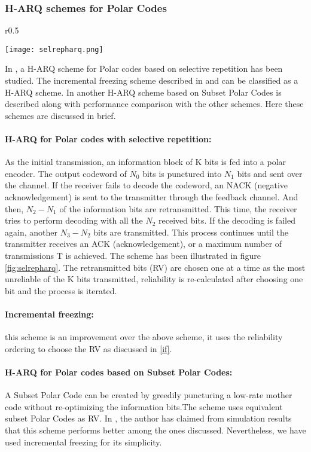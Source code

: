 \documentclass[
11pt, %
a4paper, %
oneside, %
headinclude,footinclude, %
BCOR5mm, %
]{scrartcl}
\begin{document}
\subsubsection*{H-ARQ schemes for Polar Codes}
\begin{wrapfigure}{r}{0.5\textwidth}
  \begin{center}
    \texttt{[image: selrepharq.png]}
  \end{center}
  \caption{H-ARQ for Polar Codes with selective repetition}
  \label{fig:selrepharq}
\end{wrapfigure}
In \cite{harqchen}, a H-ARQ scheme for Polar codes based on selective repetition has been studied. The incremental freezing scheme described in \cite{chen} and \cite{mondelli} can be classified as a H-ARQ scheme. In \cite{harqtav} another H-ARQ scheme based on Subset Polar Codes is described along with performance comparison with the other schemes. Here these schemes are discussed in brief.            
\paragraph{H-ARQ for Polar codes with selective repetition:}
As the initial transmission, an information block of K bits is fed into a polar
encoder. The output codeword of $N_0$ bits is punctured into $N_1$
bits and sent over the channel. If the receiver fails to decode
the codeword, an NACK (negative acknowledgement) is sent
to the transmitter through the feedback channel. And then,
$N_2-N_1$ of the information bits are retransmitted. This time,
the receiver tries to perform decoding with all the $N_2$ received
bits. If the decoding is failed again, another $N_3-N_2$ bits
are transmitted. This process continues until the transmitter
receives an ACK (acknowledgement), or a maximum number
of transmissions T is achieved. The scheme has been illustrated in figure  \ref{fig:selrepharq}. The retransmitted bits (RV) are chosen one at a time as the most unreliable of the K bits transmitted, reliability is re-calculated after choosing one bit and the process is iterated.
\paragraph{Incremental freezing:} this scheme is an improvement over the above scheme, it uses the reliability ordering to choose the RV as discussed in \ref{if}.
\paragraph{H-ARQ for Polar codes based on Subset Polar Codes:}
A Subset Polar Code can be created by greedily puncturing a low-rate mother code without re-optimizing the information bits.The scheme uses equivalent subset Polar Codes as RV. In \cite{harqtav}, the author has claimed from simulation results that this scheme performs better among the ones discussed. Nevertheless, we have used incremental freezing for its simplicity.  
\end{document}
